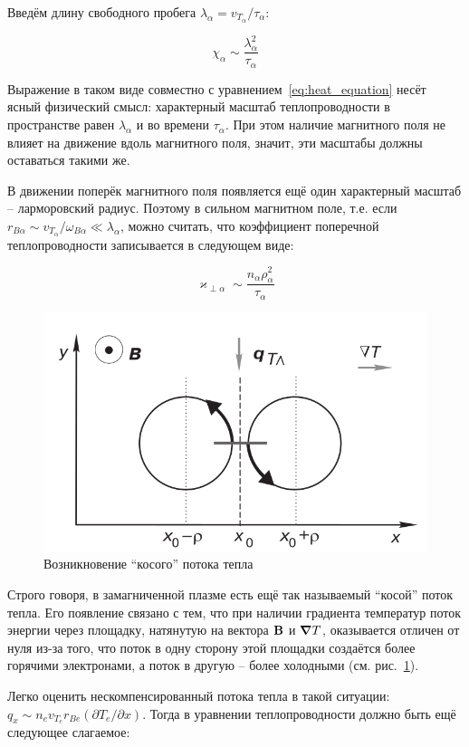 \documentclass[10pt, a4paper]{article}
\begin{document}
Введём длину свободного пробега $\lambda_\alpha = v_{T_\alpha} / \tau_\alpha$:

\begin{equation*}
	\chi_\alpha \sim \frac{\lambda_\alpha^2}{\tau_\alpha}
\end{equation*}

Выражение в таком виде совместно с уравнением~\eqref{eq:heat_equation} несёт ясный физический смысл: характерный масштаб теплопроводности в пространстве равен $\lambda_\alpha$ и во времени $\tau_\alpha$. При этом наличие магнитного поля не влияет на движение вдоль магнитного поля, значит, эти масштабы должны оставаться такими же.

В движении поперёк магнитного поля появляется ещё один характерный масштаб -- ларморовский радиус. Поэтому в сильном магнитном поле, т.е. если $r_{B\alpha} \sim v_{T_\alpha} / \omega_{B\alpha} \ll \lambda_\alpha$, можно считать, что коэффициент поперечной теплопроводности записывается в следующем виде:

\begin{equation*}
	\varkappa_{\perp\alpha} \sim \frac{n_\alpha \rho_\alpha^2}{\tau_\alpha}
\end{equation*}

\begin{figure}[ht]
	\begin{center}
		\includegraphics[width=0.5\linewidth]{5.slanted.png}
	\end{center}
    \caption{Возникновение ``косого'' потока тепла~\cite{kotelnikov}}
    \label{fig:oblique_heat_flow} 
\end{figure}

Строго говоря, в замагниченной плазме есть ещё так называемый ``косой'' поток тепла. Его появление связано с тем, что при наличии градиента температур поток энергии через площадку, натянутую на вектора $\vb{B}$ и $\grad T$, оказывается отличен от нуля из-за того, что поток в одну сторону этой площадки создаётся более горячими электронами, а поток в другую -- более холодными (см. рис.~\ref{fig:oblique_heat_flow}).

Легко оценить нескомпенсированный потока тепла в такой ситуации: $q_x \sim n_e v_{T_e} r_{Be} (\partial T_e/\partial x)$. Тогда в уравнении теплопроводности должно быть ещё следующее слагаемое:
\end{document}
